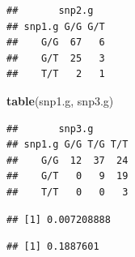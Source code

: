 \documentclass[
]{article}
\newenvironment{Shaded}{\begin{snugshade}}{\end{snugshade}}
\newcommand{\DataTypeTok}[1]{\textcolor[rgb]{0.13,0.29,0.53}{#1}}
\newcommand{\KeywordTok}[1]{\textcolor[rgb]{0.13,0.29,0.53}{\textbf{#1}}}
\newcommand{\NormalTok}[1]{#1}
\newcommand{\OperatorTok}[1]{\textcolor[rgb]{0.81,0.36,0.00}{\textbf{#1}}}
\newcommand{\StringTok}[1]{\textcolor[rgb]{0.31,0.60,0.02}{#1}}
\begin{document}
\begin{Shaded}
\end{Shaded}

\begin{verbatim}
##       snp2.g
## snp1.g G/G G/T
##    G/G  67   6
##    G/T  25   3
##    T/T   2   1
\end{verbatim}

\begin{Shaded}
\begin{Highlighting}[]
\KeywordTok{table}\NormalTok{(snp1.g, snp3.g)}
\end{Highlighting}
\end{Shaded}

\begin{verbatim}
##       snp3.g
## snp1.g G/G T/G T/T
##    G/G  12  37  24
##    G/T   0   9  19
##    T/T   0   0   3
\end{verbatim}

\begin{Shaded}
\end{Shaded}

\begin{verbatim}
## [1] 0.007208888
\end{verbatim}

\begin{Shaded}
\end{Shaded}

\begin{verbatim}
## [1] 0.1887601
\end{verbatim}
\end{document}
